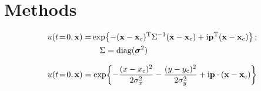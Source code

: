 
\section{Methods}\label{sec:methods}



\begin{equation}\label{eq:p4_initial_condition}
\begin{split}
    u(t\!=\!0, \mathbf{x}) = & \exp{-(\mathbf{x}-\mathbf{x}_\mathrm{c})^\mathrm{T}\Sigma^{-1}(\mathbf{x}-\mathbf{x}_\mathrm{c}) + \mathrm{i}\mathbf{p}^\mathrm{T}(\mathbf{x}-\mathbf{x}_\mathrm{c})} \,;  \\ 
    &\quad\Sigma = \mathrm{diag}(\boldsymbol{\sigma}^2) 
\end{split}
\end{equation}

\begin{equation}\label{eq:p4_initial_condition_scalarform}
    u(t\!=\!0, \mathbf{x}) = \exp{-\frac{(x-x_\mathrm{c})^2}{2\sigma_x^2} -\frac{(y-y_\mathrm{c})^2}{2\sigma_y^2} + \mathrm{i}\mathbf{p}\cdot (\mathbf{x}-\mathbf{x}_\mathrm{c})}
\end{equation}

